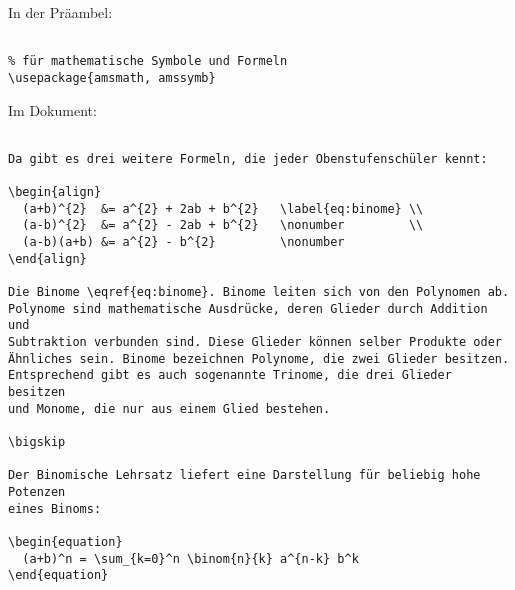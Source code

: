 
In der Präambel:

\begin{verbatim}

% für mathematische Symbole und Formeln
\usepackage{amsmath, amssymb}

\end{verbatim}

\tcblower

Im Dokument: 

\begin{verbatim}

Da gibt es drei weitere Formeln, die jeder Obenstufenschüler kennt: 

\begin{align}
  (a+b)^{2}  &= a^{2} + 2ab + b^{2}   \label{eq:binome} \\
  (a-b)^{2}  &= a^{2} - 2ab + b^{2}   \nonumber         \\
  (a-b)(a+b) &= a^{2} - b^{2}         \nonumber
\end{align}

Die Binome \eqref{eq:binome}. Binome leiten sich von den Polynomen ab. 
Polynome sind mathematische Ausdrücke, deren Glieder durch Addition und 
Subtraktion verbunden sind. Diese Glieder können selber Produkte oder 
Ähnliches sein. Binome bezeichnen Polynome, die zwei Glieder besitzen. 
Entsprechend gibt es auch sogenannte Trinome, die drei Glieder besitzen 
und Monome, die nur aus einem Glied bestehen. 

\bigskip 

Der Binomische Lehrsatz liefert eine Darstellung für beliebig hohe Potenzen 
eines Binoms:

\begin{equation}
  (a+b)^n = \sum_{k=0}^n \binom{n}{k} a^{n-k} b^k
\end{equation}

\end{verbatim}
